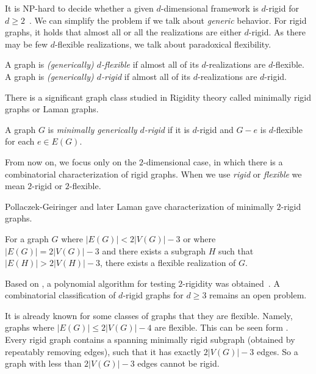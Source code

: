 It is NP-hard to decide whether a given \( d \)-dimensional framework is
\( d \)-rigid for \( d \ge 2 \)~\cite{d_rigidity_hardness}.
We can simplify the problem if we talk about \emph{generic} behavior.
%
For rigid graphs, it holds that almost all or all the realizations are
either \( d \)-rigid.
As there may be few \( d \)-flexible realizations,
we talk about paradoxical flexibility.
%
\begin{definition}
	A graph is \emph{(generically) \( d \)-flexible} if almost all of
	its \( d \)-realizations are \( d \)-flexible.
	A graph is \emph{(generically) \( d \)-rigid} if almost all of
	its \( d \)-realizations are \( d \)-rigid.
\end{definition}
%


There is a significant graph class studied in Rigidity theory
called minimally rigid graphs or Laman graphs.
%
\begin{definition}
	A graph \( G \) is \emph{minimally generically \( d \)-rigid} if it is \( d \)-rigid
	and \( G - e \) is \(d\)-flexible for each \( e \in E(G) \).
\end{definition}
%
From now on, we focus only on the \( 2 \)-dimensional case,
in which there is a combinatorial characterization of rigid graphs.
When we use \emph{rigid} or \emph{flexible} we mean \( 2 \)-rigid or \( 2 \)-flexible.

Pollaczek-Geiringer and later Laman gave characterization of minimally $2$-rigid graphs.
%
%
\begin{corollary}
	For a graph \( G \) where \( |E(G)| < 2|V(G)| - 3 \) or
	where \( |E(G)| = 2|V(G)| - 3 \) and there exists a subgraph \( H \) such that \( |E(H)| > 2|V(H)| - 3 \),
	there exists a flexible realization of \( G \).
\end{corollary}
%
Based on ,
a polynomial algorithm
for testing $2$-rigidity was obtained~\cite{polynomial-min-rigid}.
A combinatorial classification of $d$-rigid graphs
for $d \geq 3$ remains an open problem.

It is already known for some classes of graphs that they are flexible.
Namely, graphs where \( |E(G)| \le 2|V(G)| - 4 \) are flexible.
This can be seen form .
Every rigid graph contains a spanning minimally rigid subgraph
(obtained by repeatably removing edges),
such that it has exactly \( 2|V(G)| - 3 \) edges.
So a graph with less than \( 2|V(G)| - 3 \) edges cannot be rigid.

